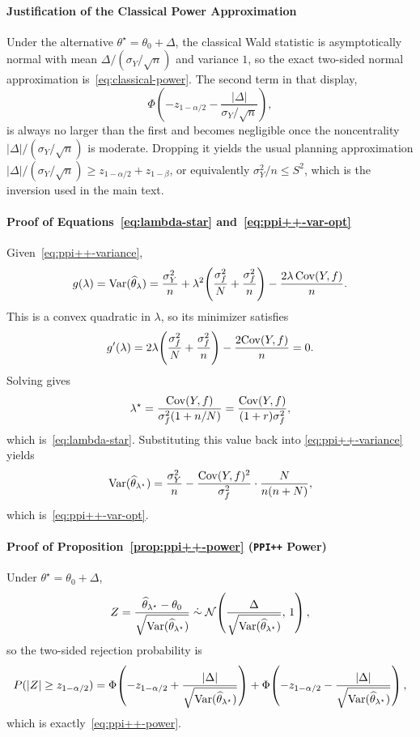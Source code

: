 \paragraph{Justification of the Classical Power Approximation}
\label{sec:proof-vanilla-power}
Under the alternative $\theta^\star=\theta_0+\Delta$, the classical Wald
statistic is asymptotically normal with mean
$\Delta/(\sigma_Y/\sqrt{n})$ and variance $1$, so the exact two-sided normal
approximation is~\eqref{eq:classical-power}. The second term in that display,
\[
\Phi\!\left(-z_{1-\alpha/2}-\frac{|\Delta|}{\sigma_Y/\sqrt{n}}\right),
\]
is always no larger than the first and becomes negligible once the noncentrality
$|\Delta|/(\sigma_Y/\sqrt{n})$ is moderate. Dropping it yields the usual
planning approximation
$|\Delta|/(\sigma_Y/\sqrt{n}) \ge z_{1-\alpha/2}+z_{1-\beta}$, or equivalently
$\sigma_Y^2/n \le S^2$, which is the inversion used in the main text.

\paragraph{Proof of Equations~\eqref{eq:lambda-star} and~\eqref{eq:ppi++-var-opt}}
Given~\eqref{eq:ppi++-variance},
\[
g(\lambda)
= \mathrm{Var}(\widehat{\theta}_\lambda)
= \frac{\sigma_Y^2}{n}
+ \lambda^2\!\left(\frac{\sigma_f^2}{N}+\frac{\sigma_f^2}{n}\right)
- \frac{2\lambda\,\mathrm{Cov}(Y,f)}{n}.
\]
This is a convex quadratic in $\lambda$, so its minimizer satisfies
\[
g'(\lambda)
= 2\lambda\!\left(\frac{\sigma_f^2}{N}+\frac{\sigma_f^2}{n}\right)
- \frac{2\mathrm{Cov}(Y,f)}{n}
= 0.
\]
Solving gives
\[
\lambda^\star
= \frac{\mathrm{Cov}(Y,f)}{\sigma_f^2(1+n/N)}
= \frac{\mathrm{Cov}(Y,f)}{(1+r)\sigma_f^2},
\]
which is~\eqref{eq:lambda-star}. Substituting this value back into
\eqref{eq:ppi++-variance} yields
\[
\mathrm{Var}(\widehat{\theta}_{\lambda^\star})
= \frac{\sigma_Y^2}{n}
- \frac{\mathrm{Cov}(Y,f)^2}{\sigma_f^2}\cdot \frac{N}{n(n+N)},
\]
which is~\eqref{eq:ppi++-var-opt}.

\paragraph{Proof of Proposition~\ref{prop:ppi++-power} (\texttt{PPI++} Power)}
Under $\theta^\star=\theta_0+\Delta$,
\[
Z
= \frac{\widehat{\theta}_{\lambda^\star}-\theta_0}
{\sqrt{\mathrm{Var}(\widehat{\theta}_{\lambda^\star})}}
\;\dot{\sim}\;
\mathcal N\!\left(
\frac{\Delta}{\sqrt{\mathrm{Var}(\widehat{\theta}_{\lambda^\star})}},\,1
\right),
\]
so the two-sided rejection probability is
\[
P(|Z|\ge z_{1-\alpha/2})
=
\Phi\!\left(-z_{1-\alpha/2}
+ \frac{|\Delta|}{\sqrt{\mathrm{Var}(\widehat{\theta}_{\lambda^\star})}}\right)
+ \Phi\!\left(-z_{1-\alpha/2}
- \frac{|\Delta|}{\sqrt{\mathrm{Var}(\widehat{\theta}_{\lambda^\star})}}\right),
\]
which is exactly~\eqref{eq:ppi++-power}.

